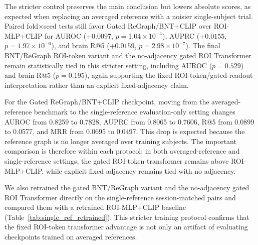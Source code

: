 \documentclass{article}
\begin{document}
The stricter control preserves the main conclusion but lowers absolute scores, as expected when replacing an averaged reference with a noisier single-subject trial. Paired fold$\times$seed tests still favor Gated ReGraph/BNT+CLIP over ROI-MLP+CLIP for AUROC ($+0.0097$, $p=1.04\times10^{-4}$), AUPRC ($+0.0155$, $p=1.97\times10^{-6}$), and brain R@5 ($+0.0159$, $p=2.98\times10^{-7}$). The final BNT/ReGraph ROI-token variant and the no-adjacency gated ROI Transformer remain statistically tied in this stricter setting, including AUROC ($p=0.529$) and brain R@5 ($p=0.195$), again supporting the fixed ROI-token/gated-readout interpretation rather than an explicit fixed-adjacency claim.

For the Gated ReGraph/BNT+CLIP checkpoint, moving from the averaged-reference benchmark to the single-reference evaluation-only setting changes AUROC from 0.8259 to 0.7828, AUPRC from 0.8065 to 0.7606, R@5 from 0.0899 to 0.0577, and MRR from 0.0695 to 0.0497. This drop is expected because the reference graph is no longer averaged over training subjects. The important comparison is therefore within each protocol: in both averaged-reference and single-reference settings, the gated ROI-token transformer remains above ROI-MLP+CLIP, while explicit fixed adjacency remains tied with no adjacency.

We also retrained the gated BNT/ReGraph variant and the no-adjacency gated ROI Transformer directly on the single-reference session-matched pairs and compared them with a retrained ROI-MLP+CLIP baseline (Table~\ref{tab:single_ref_retrained}). This stricter training protocol confirms that the fixed ROI-token transformer advantage is not only an artifact of evaluating checkpoints trained on averaged references.
\end{document}
